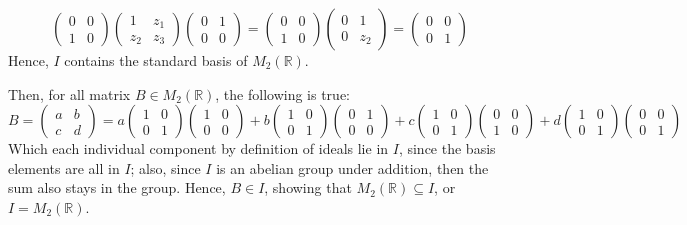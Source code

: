 \documentclass{article}
\begin{document}
$$\begin{pmatrix}
    0&0\\1&0
\end{pmatrix}
\begin{pmatrix}
    1&z_1\\z_2&z_3
\end{pmatrix}\begin{pmatrix}
    0&1\\0&0
\end{pmatrix}=\begin{pmatrix}
    0&0\\1&0
\end{pmatrix}
\begin{pmatrix}
    0&1\\0&z_2
\end{pmatrix}=\begin{pmatrix}
    0&0\\0&1
\end{pmatrix}$$
Hence, $I$ contains the standard basis of $M_2(\mathbb{R})$.

\hfill

Then, for all matrix $B\in M_2(\mathbb{R})$, the following is true:
$$B=\begin{pmatrix}
    a&b\\c&d
\end{pmatrix}=a\begin{pmatrix}
    1&0\\0&1
\end{pmatrix}\begin{pmatrix}
    1&0\\0&0
\end{pmatrix}+b\begin{pmatrix}
    1&0\\0&1
\end{pmatrix}\begin{pmatrix}
    0&1\\0&0
\end{pmatrix}+c\begin{pmatrix}
    1&0\\0&1
\end{pmatrix}\begin{pmatrix}
    0&0\\1&0
\end{pmatrix}+d\begin{pmatrix}
    1&0\\0&1
\end{pmatrix}\begin{pmatrix}
    0&0\\0&1
\end{pmatrix}$$
Which each individual component by definition of ideals lie in $I$, since the basis elements are all in $I$;
also, since $I$ is an abelian group under addition, then the sum also stays in the group.
Hence, $B\in I$, showing that $M_2(\mathbb{R})\subseteq I$, or $I=M_2(\mathbb{R})$.
\end{document}
